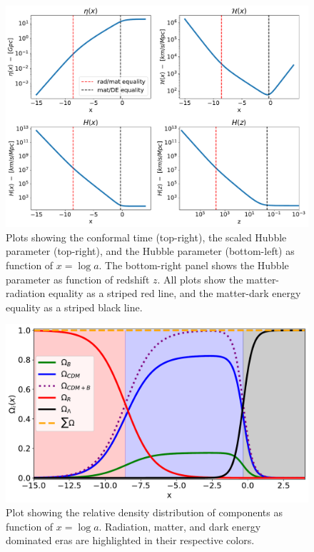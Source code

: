 \documentclass[10pt, a4paper]{article}
\begin{document}
\begin{figure}[H]
    \centering
    \includegraphics[scale=0.5]{../m1_figs/H.pdf}
    \caption{Plots showing the conformal time (top-right), the scaled Hubble parameter (top-right), and the Hubble parameter (bottom-left) as function of $x=\log{a}$. The bottom-right panel shows the Hubble parameter as function of redshift $z$. All plots show the matter-radiation equality as a striped red line, and the matter-dark energy equality as a striped black line.}
    \label{fig:H}
\end{figure}


\begin{figure}[H]
    \centering
    \includegraphics[scale=0.5]{../m1_figs/Omegas.pdf}
    \caption{Plot showing the relative density distribution of components as function of $x=\log{a}$. Radiation, matter, and dark energy dominated eras are highlighted in their respective colors.}
    \label{fig:Omegas}
\end{figure}
\end{document}
